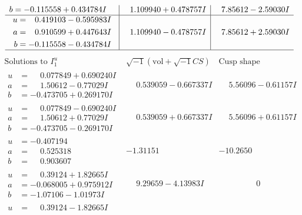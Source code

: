 \documentclass[1p]{elsarticle_modified}
\theoremstyle{definition}
\newcommand{\I}{\sqrt{-1}}
\begin{document}
$$\begin{array}{c|c|c}
\begin{aligned}
b &= -0.115558 + 0.434784 I\end{aligned}
 & \phantom{-}1.109940 + 0.478757 I & \phantom{-}7.85612 - 2.59030 I \\ \hline\begin{aligned}
u &= \phantom{-}0.419103 - 0.595983 I \\
a &= \phantom{-}0.910599 + 0.447643 I \\
b &= -0.115558 - 0.434784 I\end{aligned}
 & \phantom{-}1.109940 - 0.478757 I & \phantom{-}7.85612 + 2.59030 I\\
 \hline 
 \end{array}$$\newpage$$\begin{array}{c|c|c}  
\text{Solutions to }I^u_{1}& \I (\text{vol} + \sqrt{-1}CS) & \text{Cusp shape}\\
 \hline 
\begin{aligned}
u &= \phantom{-}0.077849 + 0.690240 I \\
a &= \phantom{-}1.50612 - 0.77029 I \\
b &= -0.473705 + 0.269170 I\end{aligned}
 & \phantom{-}0.539059 - 0.667337 I & \phantom{-}5.56096 - 0.61157 I \\ \hline\begin{aligned}
u &= \phantom{-}0.077849 - 0.690240 I \\
a &= \phantom{-}1.50612 + 0.77029 I \\
b &= -0.473705 - 0.269170 I\end{aligned}
 & \phantom{-}0.539059 + 0.667337 I & \phantom{-}5.56096 + 0.61157 I \\ \hline\begin{aligned}
u &= -0.407194\phantom{ +0.000000I} \\
a &= \phantom{-}0.525318\phantom{ +0.000000I} \\
b &= \phantom{-}0.903607\phantom{ +0.000000I}\end{aligned}
 & -1.31151\phantom{ +0.000000I} & -10.2650\phantom{ +0.000000I} \\ \hline\begin{aligned}
u &= \phantom{-}0.39124 + 1.82665 I \\
a &= -0.068005 + 0.975912 I \\
b &= -1.07106 - 1.01973 I\end{aligned}
 & \phantom{-}9.29659 - 4.13983 I & \phantom{-0.000000 } 0 \\ \hline\begin{aligned}
u &= \phantom{-}0.39124 - 1.82665 I \\

\end{aligned}
\end{array}$$
\end{document}

